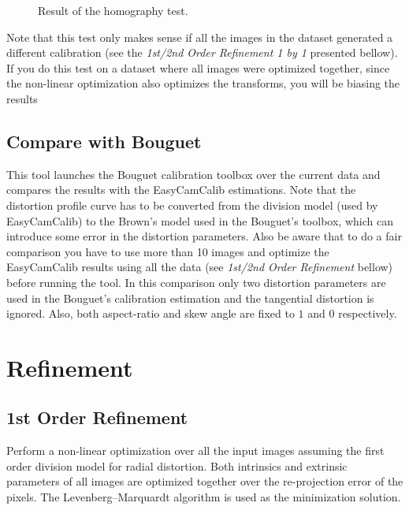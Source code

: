 \documentclass[article,11pt]{memoir}
\begin{document}
\begin{figure}
\centering
  \hspace{3px}
  \hspace{3px}
\caption{Result of the homography test.}
\label{fig:homoUI_result}
\end{figure}

Note that this test only makes sense if all the images in the dataset generated a different calibration (see the \textit{1st/2nd Order Refinement 1 by 1} presented bellow). If you do this test on a dataset where all images were optimized together, since the non-linear optimization also optimizes the transforms, you will be biasing the results  


\subsection{Compare with Bouguet}
This tool launches the Bouguet \cite{bouguet} calibration toolbox over the current data and compares the results with the EasyCamCalib estimations. Note that the distortion profile curve has to be converted from the division model \cite{divmodel} (used by EasyCamCalib) to the Brown's model \cite{brown} used in the Bouguet's toolbox, which can introduce some error in the distortion parameters. Also be aware that to do a fair comparison you have to use more than 10 images and optimize the EasyCamCalib results using all the data (see \textit{1st/2nd Order Refinement} bellow) before running the tool. In this comparison only two distortion parameters are used in the Bouguet's calibration estimation and the tangential distortion is ignored. Also, both aspect-ratio and skew angle are fixed to $1$ and $0$ respectively. 


\section{Refinement}
\subsection{1st Order Refinement}
Perform a non-linear optimization over all the input images assuming the first order division model for radial distortion. Both intrinsics and extrinsic parameters of all images are optimized together over the re-projection error of the pixels. The Levenberg–Marquardt algorithm is used as the minimization solution.
\end{document}
